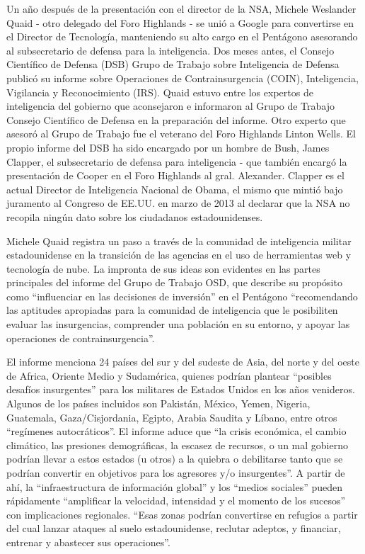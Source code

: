 \documentclass[10pt,a5paper,twoside,spanish,]{book}
\begin{document}
Un año después de la presentación con el director de la NSA, Michele
Weslander Quaid - otro delegado del Foro Highlands - se unió a Google
para convertirse en el Director de Tecnología, manteniendo su alto cargo
en el Pentágono asesorando al subsecretario de defensa para la
inteligencia. Dos meses antes, el Consejo Científico de Defensa (DSB)
Grupo de Trabajo sobre Inteligencia de Defensa publicó su informe sobre
Operaciones de Contrainsurgencia (COIN), Inteligencia, Vigilancia y
Reconocimiento (IRS). Quaid estuvo entre los expertos de inteligencia
del gobierno que aconsejaron e informaron al Grupo de Trabajo Consejo
Científico de Defensa en la preparación del informe. Otro experto que
asesoró al Grupo de Trabajo fue el veterano del Foro Highlands Linton
Wells. El propio informe del DSB ha sido encargado por un hombre de
Bush, James Clapper, el subsecretario de defensa para inteligencia - que
también encargó la presentación de Cooper en el Foro Highlands al gral.
Alexander. Clapper es el actual Director de Inteligencia Nacional de
Obama, el mismo que mintió bajo juramento al Congreso de EE.UU. en marzo
de 2013 al declarar que la NSA no recopila ningún dato sobre los
ciudadanos estadounidenses.

Michele Quaid registra un paso a través de la comunidad de inteligencia
militar estadounidense en la transición de las agencias en el uso de
herramientas web y tecnología de nube. La impronta de sus ideas son
evidentes en las partes principales del informe del Grupo de Trabajo
OSD, que describe su propósito como ``influenciar en las decisiones de
inversión'' en el Pentágono ``recomendando las aptitudes apropiadas para
la comunidad de inteligencia que le posibiliten evaluar las
insurgencias, comprender una población en su entorno, y apoyar las
operaciones de contrainsurgencia''.

El informe menciona 24 países del sur y del sudeste de Asia, del norte y
del oeste de Africa, Oriente Medio y Sudamérica, quienes podrían
plantear ``posibles desafíos insurgentes'' para los militares de Estados
Unidos en los años venideros. Algunos de los países incluidos son
Pakistán, México, Yemen, Nigeria, Guatemala, Gaza/Cisjordania, Egipto,
Arabia Saudita y Líbano, entre otros ``regímenes autocráticos''. El
informe aduce que ``la crisis económica, el cambio climático, las
presiones demográficas, la escasez de recursos, o un mal gobierno
podrían llevar a estos estados (u otros) a la quiebra o debilitarse
tanto que se podrían convertir en objetivos para los agresores y/o
insurgentes''. A partir de ahí, la ``infraestructura de información
global'' y los ``medios sociales'' pueden rápidamente ``amplificar la
velocidad, intensidad y el momento de los sucesos'' con implicaciones
regionales. ``Esas zonas podrían convertirse en refugios a partir del
cual lanzar ataques al suelo estadounidense, reclutar adeptos, y
financiar, entrenar y abastecer sus operaciones''.
\end{document}
